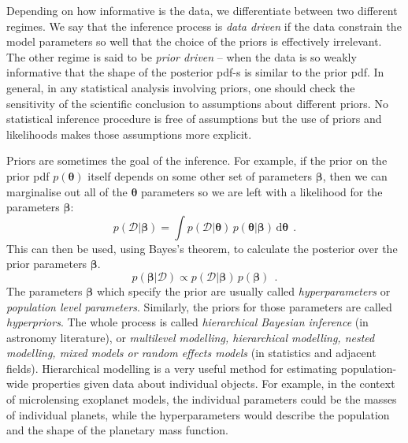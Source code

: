 \documentclass[12pt,dvipsnames]{report}
\newcommand{\ud}{\,\mathrm{d}}
\renewcommand{\vec}[1]{\boldsymbol{\mathbf{#1}}}
\newcommand{\hquad}{~~}
\begin{document}
Depending on how informative is the data, we differentiate between two different
regimes. We say that the inference process is \emph{data driven} if the data
constrain the model parameters so well that the choice of the priors is
effectively irrelevant. The other regime is said to be \emph{prior driven} -- 
when the data is so weakly informative that the shape of the posterior pdf-s is
similar to the prior pdf. In general, in any statistical analysis involving
priors, one should check the sensitivity of the scientific conclusion to
assumptions about different priors. No statistical inference procedure is free of
assumptions but the use of priors and likelihoods makes those assumptions more
explicit.

Priors are sometimes the goal of the inference. For example, if the prior on
the prior pdf $p(\vec{\theta})$ itself depends on some other set of parameters
$\vec{\beta}$, then we can marginalise out all of the $\vec{\theta}$ parameters
so we are left with a likelihood for the parameters $\vec{\beta}$:
\begin{equation}
    p(\mathcal{D}\lvert\vec{\beta})=\int p(\mathcal{D}\lvert\vec{\theta})\,p(\vec{\theta}\lvert
    \vec{\beta})\ud \vec{\theta}
    \hquad.
\end{equation}
This can then be used, using Bayes's theorem, to calculate the posterior
over the prior parameters $\bm\beta$.
\begin{equation}
    p(\bm\beta\lvert\mathcal{D})\propto p(\mathcal{D}\lvert\vec{\beta})
    \,p(\bm\beta)
    \hquad.
\end{equation}
The parameters $\bm\beta$ which specify the prior are usually called
\emph{hyperparameters} or \emph{population level parameters}. Similarly, the priors
for those parameters are called \emph{hyperpriors}.
The whole process is called \emph{hierarchical Bayesian inference}
(in astronomy literature),  or \emph{multilevel modelling, hierarchical modelling,
    nested modelling, mixed models or random effects models}
(in statistics and adjacent fields).
Hierarchical modelling is a very useful method for estimating
population-wide properties given data about individual objects. For example,
in the context of microlensing exoplanet models, 
the individual parameters could be the
masses of individual planets, while the hyperparameters would describe the
population and the shape of the planetary mass function. 
\end{document}
